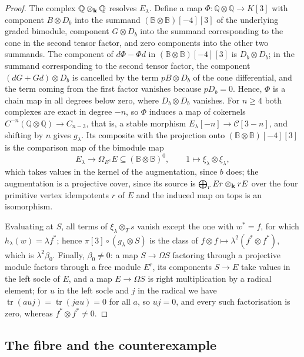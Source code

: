 \begin{proof}
  The complex ${\mathbb{Q}\otimes_{\mathbf{k}}\mathbb{Q}}$ resolves $E_\lambda$. Define a
  map ${\Phi\colon\mathbb{Q}\otimes\mathbb{Q}\to K[3]}$ with component ${B\otimes
  D_b}$ into the summand ${(\mathbb{B}\otimes\mathbb{B})[-4][3]}$ of the underlying
  graded bimodule, component
  ${G\otimes D_b}$ into the summand corresponding to the cone in the second tensor
  factor, and zero
  components into the other two summands. The component of ${d\Phi-\Phi d}$ in
  ${(\mathbb B\otimes\mathbb B)[-4][3]}$ is ${D_b\otimes D_b}$; in the summand
  corresponding to the second tensor factor, the component ${(dG+Gd)\otimes D_b}$
  is cancelled by the term ${pB\otimes D_b}$ of the cone differential, and the
  term coming from the first factor vanishes because ${pD_b=0}$. Hence, $\Phi$ is
  a chain map in all degrees below zero, where ${D_b\otimes D_b}$ vanishes. For
  ${n\geq4}$ both complexes are exact in degree ${-n}$, so $\Phi$ induces a map
  of cokernels ${C^{-n}(\mathbb{Q}\otimes\mathbb{Q})\to C_{n-3}}$, that is, a
  stable morphism ${E_\lambda[-n]\to\mathcal{C}[3-n]}$, and shifting by $n$ gives
  $g_\lambda$. Its composite with the projection onto ${(\mathbb B\otimes\mathbb
  B)[-4][3]}$ is the
  comparison map of the bimodule map
  \[
    E_\lambda\longrightarrow\Omega_{E^e}E\subseteq(\mathbb{B}\otimes
    \mathbb{B})^0,\qquad1\longmapsto\xi_\lambda\otimes\xi_\lambda,
  \]
  which takes values in the kernel of the augmentation, since $b$ does; the
  augmentation is a projective cover, since its source is
  ${\bigoplus_rEr\otimes_{\mathbf{k}} rE}$ over the four primitive vertex idempotents $r$
  of $E$ and the induced map on tops is an isomorphism.

  Evaluating at $S$, all terms of ${\xi_\lambda\otimes_Ts}$ vanish except the
  one with ${w^*=f}$, for which ${h_\lambda(w)=\lambda f^*}$; hence
  ${\pi[3]\circ(g_\lambda\otimes S)}$ is the class of
  ${f\otimes f\mapsto\lambda^2(f^*\otimes f^*)}$, which is $\lambda^2\beta_0$.
  Finally, ${\beta_0\neq0}$: a map ${S\to\Omega S}$ factoring through a projective
  module factors through a free module $E^r$, its components ${S\to E}$ take
  values in the left socle of $E$, and a map ${E\to\Omega S}$ is right
  multiplication by a radical element; for $u$ in the left socle and $j$ in the
  radical we have ${\operatorname{tr}(auj)=\operatorname{tr}(jau)=0}$ for all
  $a$, so ${uj=0}$, and every such factorisation is zero, whereas
  ${f^*\otimes f^*\neq0}$.
\end{proof}

\subsection{The fibre and the counterexample}
\label{subsec:fibre}

